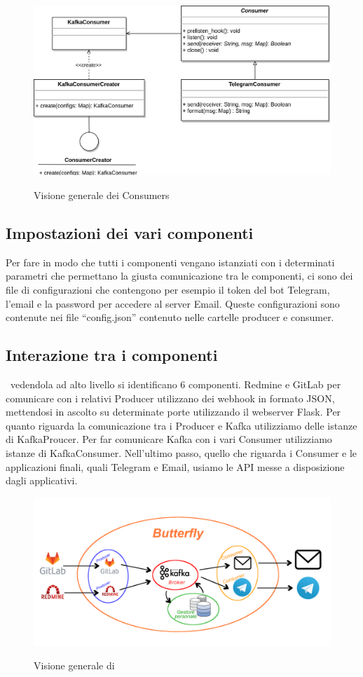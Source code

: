 \begin{figure}[H]
    \centering
    \includegraphics[width=\textwidth]{img/Consumers.png}\\
    \caption{Visione generale dei Consumers}
    \label{fig:consumers}
\end{figure}

\subsection{Impostazioni dei vari componenti}

Per fare in modo che tutti i componenti vengano istanziati con i determinati parametri che permettano la giusta comunicazione tra le componenti,
ci sono dei file di configurazioni che contengono per esempio il token del bot Telegram, l'email e la password per accedere al server Email. Queste configurazioni
sono contenute nei file ``config.json'' contenuto nelle cartelle producer e consumer.

\subsection{Interazione tra i componenti}

\progetto\ vedendola ad alto livello si identificano 6 componenti. Redmine e GitLab per comunicare con i relativi Producer utilizzano dei webhook in formato JSON,
mettendosi in ascolto su determinate porte utilizzando il webserver Flask. Per quanto riguarda la comunicazione tra i Producer e Kafka utilizziamo delle istanze
di KafkaProucer. Per far comunicare Kafka con i vari Consumer utilizziamo istanze di KafkaConsumer. Nell'ultimo passo, quello che riguarda i Consumer e le applicazioni finali, quali Telegram e Email, usiamo le API messe a disposizione dagli applicativi.

\begin{figure}[H]
    \centering
    \includegraphics[width=\textwidth]{img/butterfly.png}\\
    \caption{Visione generale di \progetto}
    \label{fig:butterfly}
\end{figure}






